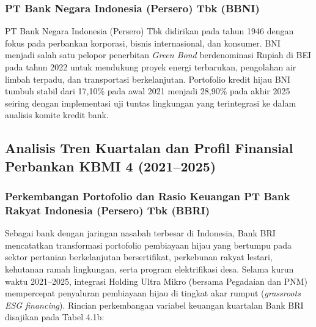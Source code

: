\documentclass[12pt,a4paper]{article}
\numberwithin{equation}{section}
\begin{document}
\subsubsection{PT Bank Negara Indonesia (Persero) Tbk (BBNI)}
\noindent
PT Bank Negara Indonesia (Persero) Tbk didirikan pada tahun 1946 dengan fokus pada perbankan korporasi, bisnis internasional, dan konsumer. BNI menjadi salah satu pelopor penerbitan \emph{Green Bond} berdenominasi Rupiah di BEI pada tahun 2022 untuk mendukung proyek energi terbarukan, pengolahan air limbah terpadu, dan transportasi berkelanjutan. Portofolio kredit hijau BNI tumbuh stabil dari 17,10\% pada awal 2021 menjadi 28,90\% pada akhir 2025 seiring dengan implementasi uji tuntas lingkungan yang terintegrasi ke dalam analisis komite kredit bank.


\subsection{Analisis Tren Kuartalan dan Profil Finansial Perbankan KBMI 4 (2021--2025)}

\subsubsection{Perkembangan Portofolio dan Rasio Keuangan PT Bank Rakyat Indonesia (Persero) Tbk (BBRI)}
\noindent
Sebagai bank dengan jaringan nasabah terbesar di Indonesia, Bank BRI mencatatkan transformasi portofolio pembiayaan hijau yang bertumpu pada sektor pertanian berkelanjutan bersertifikat, perkebunan rakyat lestari, kehutanan ramah lingkungan, serta program elektrifikasi desa. Selama kurun waktu 2021--2025, integrasi Holding Ultra Mikro (bersama Pegadaian dan PNM) mempercepat penyaluran pembiayaan hijau di tingkat akar rumput (\emph{grassroots ESG financing}). Rincian perkembangan variabel keuangan kuartalan Bank BRI disajikan pada Tabel 4.1b:
\end{document}
